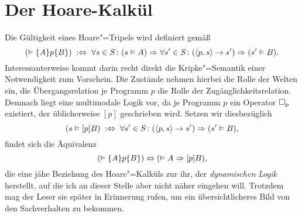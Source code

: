 \section{Der Hoare-Kalkül}

Die Gültigkeit eines Hoare"=Tripels wird definiert gemäß
\[(\vDash\{A\}p\{B\})\;:\Leftrightarrow\;\forall s\in S\colon (s\vDash A)\Rightarrow\forall s'\in S\colon
(\langle p,s\rangle\to s')\Rightarrow (s'\vDash B).\]
Interessanterweise kommt darin recht direkt die Kripke"=Semantik einer
Notwendigkeit zum Vorschein. Die Zustände nehmen hierbei die Rolle der
Welten ein, die Übergangsrelation je Programm $p$ die Rolle der
Zugänglichkeitsrelation. Demnach liegt eine multimodale Logik vor, da je
Programm $p$ ein Operator $\Box_p$ existiert, der üblicherweise $[p]$
geschrieben wird. Setzen wir diesbezüglich
\[(s\vDash [p]B)\;:\Leftrightarrow\;\forall s'\in S\colon
(\langle p,s\rangle\to s')\Rightarrow (s'\vDash B),\]
findet sich die Äquivalenz
\[(\vDash\{A\}p\{B\})\Leftrightarrow (\vDash A\Rightarrow [p]B),\]
die eine jähe Beziehung des Hoare"=Kalküls zur ihr, der \emph{dynamischen Logik} herstellt, auf
die ich an dieser Stelle aber nicht näher eingehen will. Trotzdem mag der
Leser sie später in Erinnerung rufen, um ein übersichtlicheres Bild
von den Sachverhalten zu bekommen.

